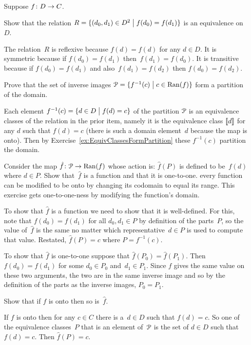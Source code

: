 \documentclass{ibl}  %
\begin{document}
\begin{problem}
Suppose $\mbox{$f\colon D\to C$}$.
\begin{exes}
\begin{exercise} 
  Show that the relation
  $R=\{(d_0,d_1)\in D^2 \bigm| f(d_0)=f(d_1)\}$ 
  is an equivalence on~$D$.
\end{exercise} 
\begin{answer}
  The relation~$R$ is reflexive because $f(d)=f(d)$ for any $d\in D$.
  It is symmetric because if $f(d_0)=f(d_1)$ then~$f(d_1)=f(d_0)$.
  It is transitive because if $f(d_0)=f(d_1)$ and also~$f(d_1)=f(d_2)$ 
  then $f(d_0)=f(d_2)$.  
\end{answer}
\begin{exercise} 
  Prove that the set of inverse images 
  $\EuScript{P}=\{f^{-1}(c) \bigm| c\in\operatorname{Ran}(f)\}$ 
  form a partition of the domain.
\end{exercise}
\begin{answer}
  Each element $f^{-1}(c)=\{d\in D \bigm| f(d)=c\}$ of the partition
  $\EuScript{P}$ is  
  an equivalence classes of the relation in the prior 
  item,
  namely it is the equivalence class $\llbracket d \rrbracket$ for any $d$ such that
  $f(d)=c$ (there is such a domain element~$d$ because the map is onto).
  Then by Exercise~\ref{ex:EquivClassesFormPartition} these $f^{-1}(c)$
  partition the domain. 
\end{answer}
\begin{exercise} 
  Consider the map
  $\mbox{$\hat{f}\colon \EuScript{P}\to \operatorname{Ran}(f)$}$ whose action is:
  $\hat{f}(P)$ is defined to be~$f(d)$ where $d\in P$.
  Show that~$\hat{f}$ is a function and that it is one-to-one.
  \remark every function can be modified to be onto by 
    changing its codomain to equal its range.
    This exercise gets one-to-one-ness by modifying the function's domain.
\end{exercise}
\begin{answer}
  To show that $\hat{f}$ is a function we need to show that
  it is well-defined.
  For this, note that $f(d_0)=f(d_1)$ for all $d_0,d_1\in P$
  by definition of the parts~$P$, so 
  the value of~$\hat{f}$ is the same no matter which representative~$d\in P$
  is used to compute that value.
  Restated, $\hat{f}(P)=c$ where $P=f^{-1}(c)$.

  To show that $\hat{f}$ is one-to-one suppose that $\hat{f}(P_0)=\hat{f}(P_1)$.
  Then $f(d_0)=f(d_1)$ for some $d_0\in P_0$ and~$d_1\in P_1$.
  Since $f$ gives the same value on these two arguments,
  the two are in the same inverse image and so  
  by the definition of the parts as the inverse images,
  $P_0=P_1$.  
\end{answer}
\begin{exercise} 
  Show that if $f$ is onto then so is~$\hat{f}$.
\end{exercise}
\begin{answer}
  If $f$ is onto then for any $c\in C$ there is a~$d\in D$
  such that $f(d)=c$.
  So one of the equivalence classes~$P$ that is an element of~$\EuScript{P}$ 
  is the set of 
  $d\in D$ such that $f(d)=c$.
  Then $\hat{f}(P)=c$.  
\end{answer}
\end{exes}
\end{problem}
\end{document}
